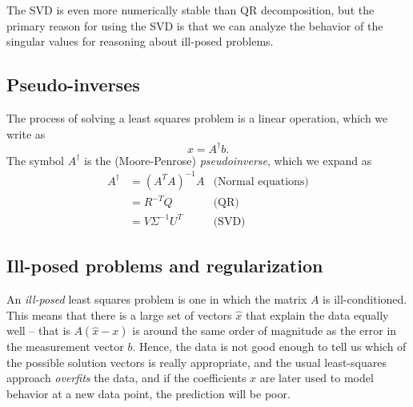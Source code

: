 \documentclass[12pt, leqno]{article}
\begin{document}
The SVD is even more numerically stable than QR decomposition,
but the primary reason for using the SVD is that we can analyze
the behavior of the singular values for reasoning about ill-posed
problems.

\subsection{Pseudo-inverses}

The process of solving a least squares problem is a linear operation,
which we write as
\[
  x = A^\dagger b.
\]
The symbol $A^\dagger$ is the (Moore-Penrose) {\em pseudoinverse},
which we expand as
\begin{align*}
  A^\dagger
  &= (A^T A)^{-1} A & \mbox{(Normal equations)} \\
  &= R^{-T} Q & \mbox{(QR)} \\
  &= V \Sigma^{-1} U^T & \mbox{(SVD)}
\end{align*}

\subsection{Ill-posed problems and regularization}

An {\em ill-posed} least squares problem is one in which the matrix
$A$ is ill-conditioned.  This means that there is a large set of
vectors $\hat{x}$ that explain the data equally well -- that is
$A(\hat{x}-x)$ is around the same order of magnitude as the
error in the measurement vector $b$.  Hence, the data is not good
enough to tell us which of the possible solution vectors is
really appropriate, and the usual least-squares approach
{\em overfits} the data, and if the coefficients $x$ are later used
to model behavior at a new data point, the prediction will be poor.
\end{document}
